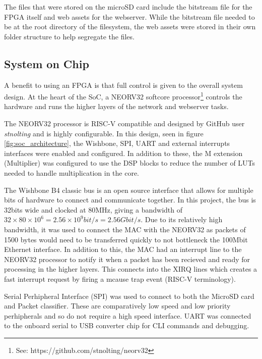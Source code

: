 The files that were stored on the microSD card include the bitstream file for the FPGA itself and web assets for the webserver. While the bitstream file needed to be at the root directory of the filesystem, the web assets were stored in their own folder structure to help segregate the files.  








 
\subsection{System on Chip}

A benefit to using an FPGA is that full control is given to the overall system design. At the heart of the SoC, a NEORV32 softcore processor\footnote[1]{See: https://github.com/stnolting/neorv32} controls the hardware and runs the higher layers of the network and webserver tasks.

The NEORV32 processor is RISC-V compatible and designed by GitHub user \textit{stnolting} and is highly configurable. In this design, seen in figure \ref{fig:soc_architecture}, the Wishbone, SPI, UART and external interrupts interfaces were enabled and configured. In addition to these, the M extension (Multiplier) was configured to use the DSP blocks to reduce the number of LUTs needed to handle multiplication in the core. 

The Wishbone B4 classic bus is an open source interface that allows for multiple bits of hardware to connect and communicate together. In this project, the bus is 32bits wide and clocked at 80MHz, giving a bandwidth of $32 \times 80 \times 10^6 = 2.56\times 10^9bit/s=2.56Gbit/s$. Due to its relatively high bandwidth, it was used to connect the MAC with the NEORV32 as packets of 1500 bytes would need to be transferred quickly to not bottleneck the 100Mbit Ethernet interface. In addition to this, the MAC had an interrupt line to the NEORV32 processor to notify it when a packet has been recieved and ready for processing in the higher layers. This connects into the XIRQ lines which creates a fast interrupt request by firing a mcause trap event (RISC-V terminology).

Serial Perhipheral Interface (SPI) was used to connect to both the MicroSD card and Packet classifier. These are comparatively low speed and low priority perhipherals and so do not require a high speed interface. UART was connected to the onboard serial to USB converter chip for CLI commands and debugging. 




